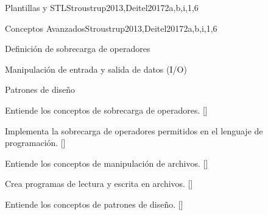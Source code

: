 \begin{syllabus}
\begin{unit}{Plantillas y STL}{}{Stroustrup2013,Deitel2017}{2}{a,b,i,1,6}
\begin{learningoutcomes}
    \end{learningoutcomes}
\end{unit}


\begin{unit}{Conceptos Avanzados}{}{Stroustrup2013,Deitel2017}{2}{a,b,i,1,6}
    \begin{topics}%
        \item Definición de sobrecarga de operadores
        \item Manipulación de entrada y salida de datos (I/O)
        \item Patrones de diseño
      
    \end{topics}
    \begin{learningoutcomes}
        \item  Entiende los conceptos de sobrecarga de operadores. [\Familiarity]
        \item  Implementa la sobrecarga de operadores permitidos en el lenguaje de programación. [\Usage]
        \item  Entiende los conceptos de manipulación de archivos. [\Familiarity]
        \item  Crea programas de lectura y escrita en archivos. [\Usage]
        \item  Entiende los conceptos de patrones de diseño. [\Familiarity]

    \end{learningoutcomes}
\end{unit}

\begin{coursebibliography}
\end{coursebibliography}

\end{syllabus}
